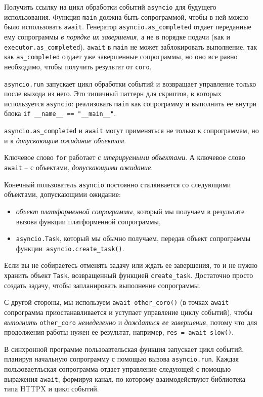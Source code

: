 \documentclass[%
	11pt,
	a4paper,
	utf8,
		]{article}
\begin{document}
Получить ссылку на цикл обработки событий \verb|asyncio| для будущего использования. Функция \verb*|main| должна быть сопрограммой, чтобы в ней можно было использовать \verb|await|. Генератор \verb*|asyncio.as_completed| отдает переданные ему сопрограммы \emph{в порядке их завершения}, а не в порядке подачи (как и \verb|executor.as_completed|). \verb|await| в \verb*|main| не может заблокировать выполнение, так как \verb|as_completed| отдает уже завершенные сопрограммы, но оно все равно необходимо, чтобы получить результат от \verb*|coro|.

\verb*|asyncio.run| запускает цикл обработки событий и возвращает управление только после выхода из него. Это типичный паттерн для скриптов, в которых используется \verb|asyncio|: реализовать \verb*|main| как сопрограмму и выполнить ее внутри блока \verb|if __name__ == "__main__"|.

\verb*|asyncio.as_completed| и \verb|await| могут применяться не только к сопрограммам, но и к \emph{допускающим ожидание объектам}.

Ключевое слово \verb*|for| работает с \emph{итерируемыми объектами}. А ключевое слово \verb*|await| -- с объектами, \emph{допускающими ожидание}.

Конечный пользователь \verb*|asyncio| постоянно сталкивается со следующими объектами, допускающими ожидание:
\begin{itemize}
	\item \emph{объект платформенной сопрограммы}, который мы получаем в результате вызова функции платформенной сопрограммы,
	
	\item \verb|asyncio.Task|, который мы обычно получаем, передав объект сопрограммы\\ функции~\verb|asyncio.create_task()|.
\end{itemize}

Если вы не собираетесь отменять задачу или ждать ее завершения, то и не нужно хранить объект \verb|Task|, возвращенный функцией \verb|create_task|. Достаточно просто создать задачу, чтобы запланировать выполнение сопрограммы.

С другой стороны, мы используем \verb|await other_coro()| (в точках \verb|await| сопрограмма приостанавливается и уступает управление циклу событий), чтобы \emph{выполнить} \verb|other_coro| \emph{немеделенно} и \emph{дождаться ее завершения}, потому что для продолжения работы нужен ее результат, например, \verb|res = await slow()|. 

В синхронной программе пользоавтельская функция запускает цикл событий, планируя начальную сопрограмму с помощью вызова \verb*|asyncio.run|. Каждая пользоваетльская сопрограмма отдает управление следующей с помощью выражения \verb|await|, формируя канал, по которому взаимодействуют библиотека типа HTTPX и цикл событий.
\end{document}
